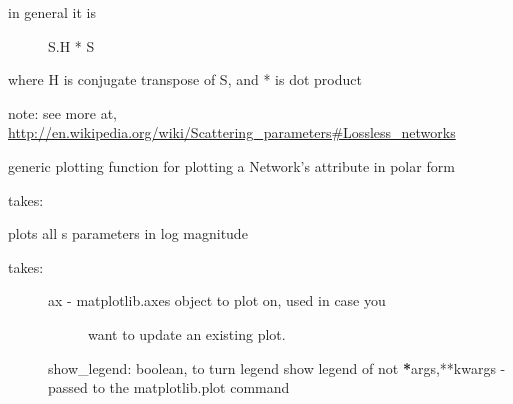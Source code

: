 \documentclass[letterpaper,10pt,english]{sphinxmanual}
\begin{document}
\begin{fulllineitems}
\begin{fulllineitems}
\begin{description}
\item[{in general it is  }] \leavevmode
S.H * S

\end{description}

where H is conjugate transpose of S, and * is dot product

note:
see more at,
\href{http://en.wikipedia.org/wiki/Scattering\_parameters\#Lossless\_networks}{http://en.wikipedia.org/wiki/Scattering\_parameters\#Lossless\_networks}

\end{fulllineitems}


\begin{fulllineitems}
\label{api/mwavepy:mwavepy.network.Network.plot_polar_generic}
generic plotting function for plotting a Network's attribute
in polar form

takes:

\end{fulllineitems}


\begin{fulllineitems}
\label{api/mwavepy:mwavepy.network.Network.plot_s_all_db}
plots all s parameters in log magnitude
\begin{description}
\item[{takes:}] \leavevmode\begin{description}
\item[{ax - matplotlib.axes object to plot on, used in case you}] \leavevmode
want to update an existing plot.

\end{description}

show\_legend: boolean, to turn legend show legend of not
{\color{red}\bfseries{}*}args,**kwargs - passed to the matplotlib.plot command

\end{description}

\end{fulllineitems}



\end{fulllineitems}
\end{document}
